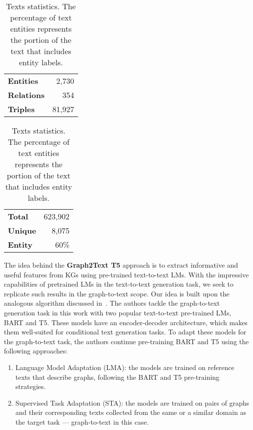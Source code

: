 \begin{table}
    \centering
    \caption{Statistics of the WebNLG 2.0 parallel knowledge graph-to-text dataset.}
    
    \begin{subtable}[t]{0.48\textwidth}
    \centering
    \begin{tabular}{lr}
        \toprule
        \textbf{Entities} & 2,730 \\
        \textbf{Relations} & 354 \\
        \textbf{Triples} & 81,927 \\
        \bottomrule
    \end{tabular}
    \caption{Knowledge Graph statistics. Total number of KG components, number of tokens in the narratives.}
    \label{tab:kg_stats}
    \end{subtable}
    \hfill
    \begin{subtable}[t]{0.48\textwidth}
    \centering
    \begin{tabular}{lr}
        \toprule
        \textbf{Total} & 623,902 \\
        \textbf{Unique} & 8,075 \\
        \textbf{Entity} & 60\% \\
        \bottomrule
    \end{tabular}
    \caption{Texts statistics. The percentage of text entities represents the portion of the text that includes entity labels.}
    \label{tab:controllable_fusion:webnlg_label}
    \end{subtable}
\end{table}

The idea behind the \textbf{Graph2Text T5} approach is to extract informative and useful features from KGs using pre-trained text-to-text LMs. With the impressive capabilities of pretrained LMs in the text-to-text generation task, we seek to replicate such results in the graph-to-text scope. Our idea is built upon the analogous algorithm discussed in~\cite{DBLP:journals/corr/abs-2007-08426}. The authors tackle the graph-to-text generation task in this work with two popular text-to-text pre-trained LMs, BART and T5. These models have an encoder-decoder architecture, which makes them well-suited for conditional text generation tasks. To adapt these models for the graph-to-text task, the authors continue pre-training BART and T5 using the following approaches:

\begin{enumerate}
    \item Language Model Adaptation (LMA): the models are trained on reference texts that describe graphs, following the BART and T5 pre-training strategies.
    \item Supervised Task Adaptation (STA): the models are trained on pairs of graphs and their corresponding texts collected from the same or a similar domain as the target task --- graph-to-text in this case. 
\end{enumerate}

